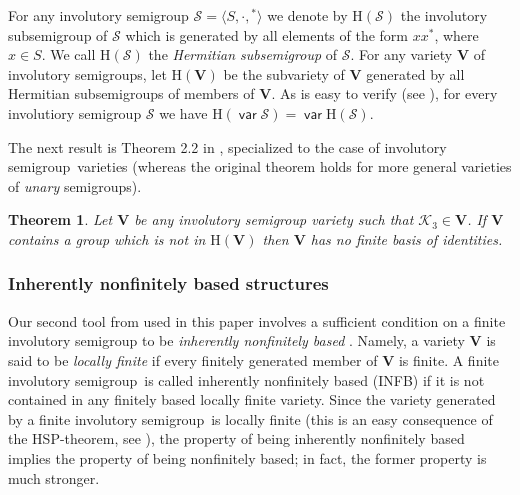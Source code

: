 \documentclass[preprint,1p,times]{elsarticle}
\DeclareMathOperator{\var}{\mathsf{var}}
\numberwithin{equation}{section}
\newtheorem{Thm}{Theorem}[section]
\theoremstyle{remark}
\def\cal{\mathcal}
\def\Sc{{\cal S}}
\def\Vc{\mathbf{V}}
\def\H{\mathrm H}
\def\sm{semi\-group}
\begin{document}
For any involutory semigroup $\mathcal{S}=\langle S,\cdot,{}^*\rangle$ we denote by $\H(\mathcal{S})$ the involutory
subsemigroup of $\mathcal{S}$ which is generated by all elements of the form $xx^*$, where $x\in S$. We call
$\H(\mathcal{S})$ the \emph{Hermitian subsemigroup} of $\mathcal{S}$. For any variety $\Vc$ of involutory semigroups,
let $\H(\Vc)$ be the subvariety of $\Vc$ generated by all Hermitian subsemigroups of members of $\Vc$. As is easy to
verify (see \cite[Lemma 2.1]{adv}), for every involutiory semigroup $\Sc$ we have $\H(\var\Sc)=\var\H(\Sc)$.

The next result is Theorem 2.2 in \cite{adv}, specialized to the case of involutory \sm\ varieties (whereas the
original theorem holds for more general varieties of \emph{unary} semigroups).

\begin{Thm}\label{Theorem 2.1}
Let $\Vc$ be any involutory semigroup variety such that $\mathcal{K}_3\in\Vc$. If  $\Vc$ contains a group which is not
in $\H(\Vc)$ then $\Vc$ has no finite basis of identities.
\end{Thm}

\subsubsection{Inherently nonfinitely based structures}\label{INFB}

Our second tool from \cite{adv} used in this paper involves a sufficient condition on a finite involutory semigroup to
be \emph{inherently nonfinitely based} \cite{McNSh}. Namely, a variety $\Vc$ is said to be \emph{locally finite} if
every finitely generated member of $\Vc$ is finite. A finite involutory \sm\ is called inherently nonfinitely based
(INFB) if it is not contained in any finitely based locally finite variety. Since the variety generated by a finite
involutory \sm\ is locally finite (this is an easy consequence of the HSP-theorem, see \cite[Theorem 10.16]{BuSa81}),
the property of being inherently nonfinitely based implies the property of being nonfinitely based; in fact, the former
property is much stronger.
\end{document}
